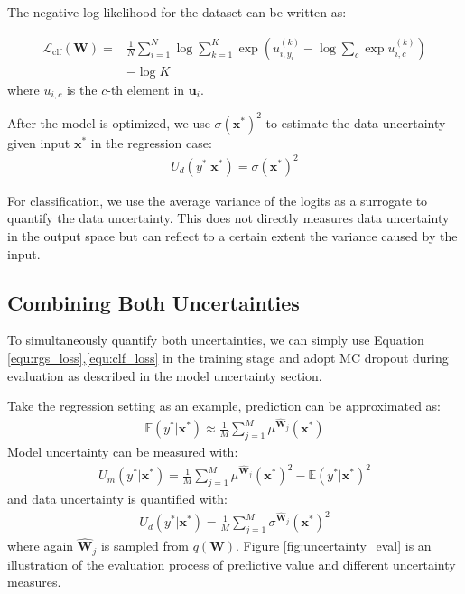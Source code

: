 \documentclass[letterpaper]{article} %
\newcommand{\vect}[1]{\mathbf{#1}}
\newcommand{\matr}[1]{\mathbf{#1}}
\newcommand{\vu}[0]{\vect{u}}
\newcommand{\vx}[0]{\vect{x}}
\newcommand{\vlb}{\mathcal{L}}
\newcommand{\E}{\mathbb{E}}
\newcommand{\mW}[0]{\matr{W}}
\newcommand{\william}[1]{\textcolor{blue}{[William: #1]}}
\begin{document}
The negative log-likelihood for the dataset can be written as:

\begin{align}
\label{equ:clf_loss}
\vlb_{\text{clf}}(\mW)= &\frac{1}{N}\sum_{i=1}^N\log\sum_{k=1}^K\exp\left(u_{i,y_i}^{(k)}-\log\sum_c\exp{u_{i,c}^{(k)}}\right) \nonumber\\
 & - \log{K}
\end{align}
where $u_{i,c}$ is the $c$-th element in $\vu_i$.

After the model is optimized, we use $\sigma(\vx^*)^2$ to estimate the data uncertainty given input $\vx^*$ in the regression case:
\begin{align}
U_d(y^*|\vx^*)=\sigma(\vx^*)^2
\end{align}

For classification, we use the average variance of the logits as a surrogate to quantify the data uncertainty. This does not directly measures data uncertainty in the output space but can reflect to a certain extent the variance caused by the input.

\subsection{Combining Both Uncertainties}
To simultaneously quantify both uncertainties, we can simply use Equation \ref{equ:rgs_loss},\ref{equ:clf_loss} in the training stage and adopt MC dropout during evaluation as described in the model uncertainty section.

Take the regression setting as an example, prediction can be approximated as:
\begin{align}
\E(y^*|\vx^*)\approx\frac{1}{M}\sum_{j=1}^M\mu^{\widehat{\mW}_j}(\vx^*)
\end{align}
Model uncertainty can be measured with:
\begin{align}
U_m(y^*|\vx^*)=\frac{1}{M}\sum_{j=1}^M\mu^{\widehat{\mW}_j}(\vx^*)^2-\E(y^*|\vx^*)^2
\end{align}
and data uncertainty is quantified with:
\begin{align}
\label{equ:ui}
U_d(y^*|\vx^*)=\frac{1}{M}\sum_{j=1}^M\sigma^{\widehat{\mW}_j}(\vx^*)^2
\end{align}
where again $\widehat{\mW}_j$ is sampled from $q(\mW)$. Figure \ref{fig:uncertainty_eval} is an illustration of the evaluation process of predictive value and different uncertainty measures.
\end{document}
